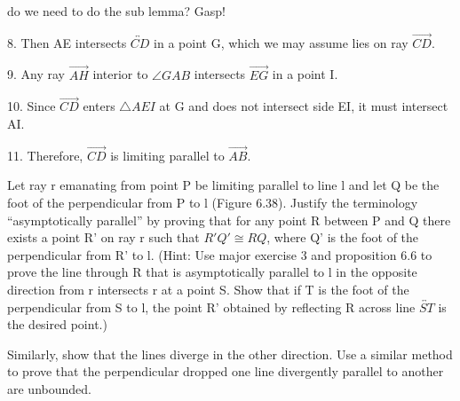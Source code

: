 \documentclass[12pt,letterpaper]{article}
\newcommand{\prob}[1]{\newpage\noindent {\bf #1}}
\begin{document}
do we need to do the sub lemma? Gasp!

8. Then AE intersects $\overleftrightarrow{CD}$ in a point G, which we may assume lies on ray $\overrightarrow{CD}$. 

9. Any ray $\overrightarrow{AH}$ interior to $\angle GAB$ intersects $\overrightarrow{EG}$ in a point I.

10.  Since $\overrightarrow{CD}$ enters $\triangle AEI$ at G and does not intersect side EI, it must intersect AI.

11. Therefore, $\overrightarrow{CD}$ is limiting parallel to $\overrightarrow{AB}$. 




\prob{Major Exercises 11 } Let ray r emanating from point P be limiting parallel to line l and let Q be the foot of the perpendicular from P to l (Figure 6.38).  Justify the terminology ``asymptotically parallel'' by proving that for any point R between P and Q there exists a point R' on ray r such that $R'Q' \cong RQ$, where Q' is the foot of the perpendicular from R' to l.  (Hint: Use major exercise 3 and proposition 6.6 to prove the line through R that is asymptotically parallel to l in the opposite direction from r intersects r at a point S.  Show that if T is the foot of the perpendicular from S to l, the point R' obtained by reflecting R across line $\overleftrightarrow{ST}$ is the desired point.)

	Similarly, show that the lines diverge in the other direction.  Use a similar method to prove that the perpendicular dropped one line divergently parallel to another are unbounded. 
\end{document}
